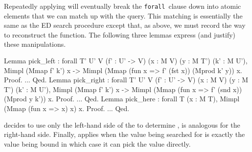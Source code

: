 \documentclass{sigplanconf}
\newcommand{\FORALL}{{\tt forall}\relax\ifmmode\ \else\xspace\fi}
\newcommand{\ltac}[0]{\ensuremath{\mathcal{L}_{\mathrm{tac}}}}
\begin{document}
Repeatedly applying  will eventually break the \FORALL clause down into atomic elements that we can match up with the query.
This matching is essentially the same as the ED search procedure except that, as above, we must record the way to reconstruct the  function.
The following three lemmas express (and justify) these manipulations.
\begin{coq}
Lemma pick_left
: forall {T' U' V} (f' : U' -> V) (x : M V) (y : M T') (k' : M U'),
  Mimpl (Mmap f' k') x ->
  Mimpl (Mmap (fun x => f' (fst x)) (Mprod k' y)) x.
Proof. ... Qed.
Lemma pick_right
: forall {T' U' V} (f' : U' -> V) (x : M V) (y : M T') (k' : M U'),
  Mimpl (Mmap f' k') x ->
  Mimpl (Mmap (fun x => f' (snd x)) (Mprod y k')) x.
Proof. ... Qed.
Lemma pick_here
: forall {T} (x : M T), Mimpl (Mmap (fun x => x) x) x.
Proof. ... Qed.
\end{coq}
 decides to use only the left-hand side of the  to determine ,  is analogous for the right-hand side.
Finally,  applies when the value being searched for is exactly the value being bound in which case it can pick the value directly.

\end{document}
